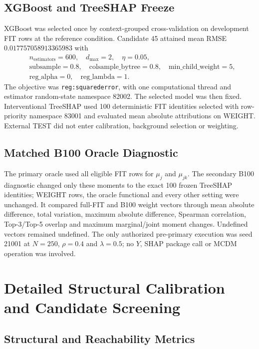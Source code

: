 \documentclass[runningheads,orivec]{llncs}
\begin{document}
\subsection{XGBoost and TreeSHAP Freeze}

XGBoost was selected once by context-grouped cross-validation on development FIT rows at the
reference condition. Candidate 45 attained mean RMSE $0.017757058913365983$ with
\begin{equation}
\begin{split}
&n_{\mathrm{estimators}}=600,\quad d_{\max}=2,\quad \eta=0.05,\\
&\text{subsample}=0.8,\quad \text{colsample\_bytree}=0.8,\quad
\text{min\_child\_weight}=5,\\
&\text{reg\_alpha}=0,\quad \text{reg\_lambda}=1.
\end{split}
\label{supp:eq:xgbparams}
\end{equation}
The objective was \texttt{reg:squarederror}, with one computational thread and estimator
random-state namespace 82002. The selected model was then fixed. Interventional TreeSHAP used 100 deterministic FIT
identities selected with row-priority namespace 83001 and evaluated mean absolute attributions
on WEIGHT. External TEST did not enter calibration, background selection or weighting.

\subsection{Matched B100 Oracle Diagnostic}

The primary oracle used all eligible FIT rows for $\mu_j$ and $\mu_{jk}$. The secondary B100
diagnostic changed only these moments to the exact 100 frozen TreeSHAP identities; WEIGHT rows,
the oracle functional and every other setting were unchanged. It compared full-FIT and B100
weight vectors through mean absolute difference, total variation, maximum absolute difference,
Spearman correlation, Top-3/Top-5 overlap and maximum marginal/joint moment changes. Undefined
vectors remained undefined. The only authorized pre-primary execution was seed 21001 at
$N=250$, $\rho=0.4$ and $\lambda=0.5$; no $Y$, SHAP package call or MCDM operation was involved.

\section{Detailed Structural Calibration and Candidate Screening}

\subsection{Structural and Reachability Metrics}
\end{document}
